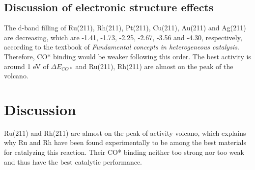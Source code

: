 \documentclass{article}
\begin{document}
    \subsection*{Discussion of electronic structure effects}
    The d-band filling of Ru(211), Rh(211), Pt(211), Cu(211), Au(211) and Ag(211) are decreasing, which are -1.41, -1.73, -2.25, -2.67, -3.56 and -4.30, respectively, according to the textbook of \textit{Fundamental concepts in heterogeneous catalysis}. Therefore, CO* binding would be weaker following this order. The best activity is around 1 eV of $\Delta E_{CO*}$ and Ru(211), Rh(211) are almost on the peak of the volcano.

\section{Discussion}
    Ru(211) and Rh(211) are almost on the peak of activity volcano, which explains why Ru and Rh have been found experimentally to be among the best materials for catalyzing this reaction. Their CO* binding neither too strong nor too weak and thus have the best catalytic performance.
\end{document}
